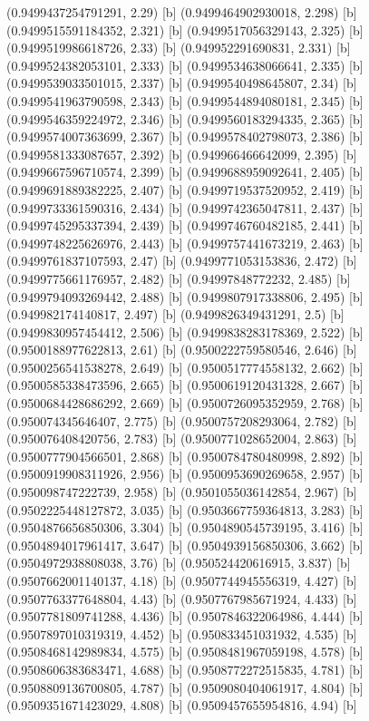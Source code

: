 {{{(0.9499437254791291, 2.29) [b] 
(0.9499464902930018, 2.298) [b] 
(0.9499515591184352, 2.321) [b] 
(0.9499517056329143, 2.325) [b] 
(0.9499519986618726, 2.33) [b] 
(0.949952291690831, 2.331) [b] 
(0.9499524382053101, 2.333) [b] 
(0.9499534638066641, 2.335) [b] 
(0.9499539033501015, 2.337) [b] 
(0.9499540498645807, 2.34) [b] 
(0.9499541963790598, 2.343) [b] 
(0.9499544894080181, 2.345) [b] 
(0.9499546359224972, 2.346) [b] 
(0.9499560183294335, 2.365) [b] 
(0.9499574007363699, 2.367) [b] 
(0.9499578402798073, 2.386) [b] 
(0.9499581333087657, 2.392) [b] 
(0.949966466642099, 2.395) [b] 
(0.9499667596710574, 2.399) [b] 
(0.9499688959092641, 2.405) [b] 
(0.9499691889382225, 2.407) [b] 
(0.9499719537520952, 2.419) [b] 
(0.9499733361590316, 2.434) [b] 
(0.9499742365047811, 2.437) [b] 
(0.9499745295337394, 2.439) [b] 
(0.9499746760482185, 2.441) [b] 
(0.9499748225626976, 2.443) [b] 
(0.9499757441673219, 2.463) [b] 
(0.9499761837107593, 2.47) [b] 
(0.9499771053153836, 2.472) [b] 
(0.9499775661176957, 2.482) [b] 
(0.94997848772232, 2.485) [b] 
(0.9499794093269442, 2.488) [b] 
(0.9499807917338806, 2.495) [b] 
(0.949982174140817, 2.497) [b] 
(0.9499826349431291, 2.5) [b] 
(0.9499830957454412, 2.506) [b] 
(0.9499838283178369, 2.522) [b] 
(0.9500188977622813, 2.61) [b] 
(0.9500222759580546, 2.646) [b] 
(0.9500256541538278, 2.649) [b] 
(0.9500517774558132, 2.662) [b] 
(0.9500585338473596, 2.665) [b] 
(0.9500619120431328, 2.667) [b] 
(0.9500684428686292, 2.669) [b] 
(0.9500726095352959, 2.768) [b] 
(0.950074345646407, 2.775) [b] 
(0.9500757208293064, 2.782) [b] 
(0.950076408420756, 2.783) [b] 
(0.9500771028652004, 2.863) [b] 
(0.9500777904566501, 2.868) [b] 
(0.9500784780480998, 2.892) [b] 
(0.9500919908311926, 2.956) [b] 
(0.9500953690269658, 2.957) [b] 
(0.950098747222739, 2.958) [b] 
(0.9501055036142854, 2.967) [b] 
(0.9502225448127872, 3.035) [b] 
(0.9503667759364813, 3.283) [b] 
(0.9504876656850306, 3.304) [b] 
(0.9504890545739195, 3.416) [b] 
(0.9504894017961417, 3.647) [b] 
(0.9504939156850306, 3.662) [b] 
(0.9504972938808038, 3.76) [b] 
(0.950524420616915, 3.837) [b] 
(0.9507662001140137, 4.18) [b] 
(0.9507744945556319, 4.427) [b] 
(0.9507763377648804, 4.43) [b] 
(0.9507767985671924, 4.433) [b] 
(0.9507781809741288, 4.436) [b] 
(0.9507846322064986, 4.444) [b] 
(0.9507897010319319, 4.452) [b] 
(0.950833451031932, 4.535) [b] 
(0.9508468142989834, 4.575) [b] 
(0.9508481967059198, 4.578) [b] 
(0.9508606383683471, 4.688) [b] 
(0.9508772272515835, 4.781) [b] 
(0.9508809136700805, 4.787) [b] 
(0.9509080404061917, 4.804) [b] 
(0.9509351671423029, 4.808) [b] 
(0.9509457655954816, 4.94) [b] 
}}}
